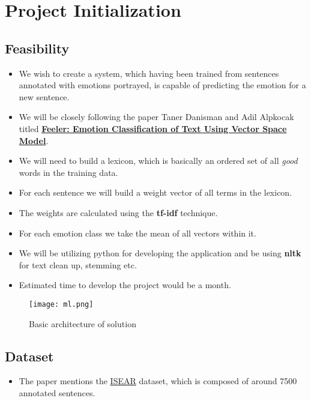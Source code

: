 \chapter{Project Initialization}
\section{Feasibility}
\label{sec-feasibility}
\begin{itemize}
\item We wish to create a system, which having been trained from sentences annotated with emotions portrayed, is capable of predicting the emotion for a new sentence.
\item We will be closely following the paper Taner Danisman and Adil Alpkocak titled \href{http://people.cs.deu.edu.tr/alpkocak/Papers/AISB08.pdf}{\textbf{Feeler: Emotion Classification of Text Using Vector Space Model}}.
\item We will need to build a lexicon, which is basically an ordered set of all \emph{good} words in the training data.
\item For each sentence we will build a weight vector of all terms in the lexicon.
\item The weights are calculated using the \textbf{tf-idf} technique.
\item For each emotion class we take the mean of all vectors within it.
\item We will be utilizing python for developing the application and be using \textbf{nltk} for text clean up, stemming etc.
\item Estimated time to develop the project would be a month.
\end{itemize}
\begin{center}
	\begin{figure}[ht!]
	\caption{Basic architecture of solution}
	\texttt{[image: ml.png]}
	\end{figure}
\end{center}
\section{Dataset}
\label{sec-dataset}
\begin{itemize}
\item The paper mentions the \href{https://github.com/bogdanneacsa/tts-master/blob/master/ISEAR/DATA.csv}{ISEAR} dataset, which is composed of around 7500 annotated sentences.
\end{itemize}

